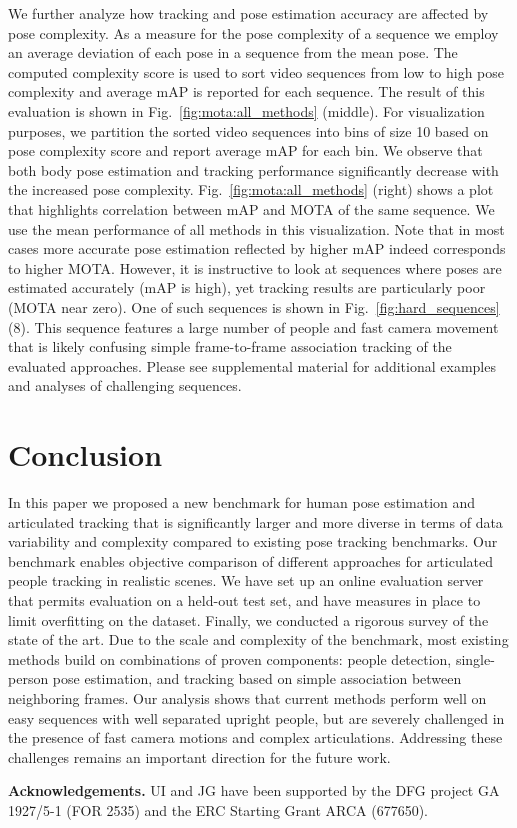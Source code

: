 \documentclass[10pt,twocolumn,letterpaper]{article}
\newcommand{\myparagraph}[1]{\vspace{0.1em}\noindent\textbf{#1}}
\begin{document}
We further analyze how tracking and pose estimation accuracy are affected by
pose complexity. As a measure for the pose
complexity of a sequence we employ an average deviation of each pose in a sequence
from the mean pose. 
The computed complexity score is used to sort video sequences from low to high pose
complexity and average mAP is reported for each
sequence. The result of this evaluation is shown in
Fig.~\ref{fig:mota:all_methods} (middle). For visualization purposes, we partition the sorted video
sequences into bins of size 10 based on pose complexity score and report average
mAP for each bin. We observe that both body pose estimation and tracking
performance significantly decrease with the increased pose complexity.
Fig.~\ref{fig:mota:all_methods} (right) shows a plot that highlights correlation
between mAP and MOTA of the same sequence. We use the mean performance of all methods in this visualization. Note that in most cases more accurate
pose estimation reflected by higher mAP indeed corresponds to higher
MOTA. However, it is instructive to look at sequences where poses are estimated
accurately (mAP is high), yet tracking results are particularly poor (MOTA near
zero). One of such sequences is shown in Fig.~\ref{fig:hard_sequences} (8). This
sequence features a large number of people and fast camera movement that is likely
confusing simple frame-to-frame association tracking of the evaluated
approaches. Please see supplemental material for additional examples and
analyses of challenging sequences.









 \section{Conclusion}
\label{sec:conclusion}
In this paper we proposed a new benchmark for human pose estimation and articulated tracking that is significantly larger and more diverse in terms of data variability and complexity compared to existing pose tracking benchmarks. Our benchmark enables objective comparison of different approaches for articulated people tracking in realistic scenes. We have set up an online evaluation server that permits evaluation on a held-out test set, and have measures in place to limit overfitting on the dataset. Finally, we conducted a rigorous survey of the state of the art. Due to the scale and complexity of the benchmark, most existing methods build on combinations of proven components: people detection, single-person pose estimation, and tracking based on simple association between neighboring frames. Our analysis shows that current methods perform well on easy sequences with well separated upright people, but are severely challenged in the presence of fast camera motions and complex articulations. Addressing these challenges remains an important direction for the future work.



 \myparagraph{Acknowledgements.}
UI and JG have been supported by the DFG project GA 1927/5-1 (FOR 2535) and the ERC Starting Grant ARCA (677650).
 {\small


}
\end{document}

